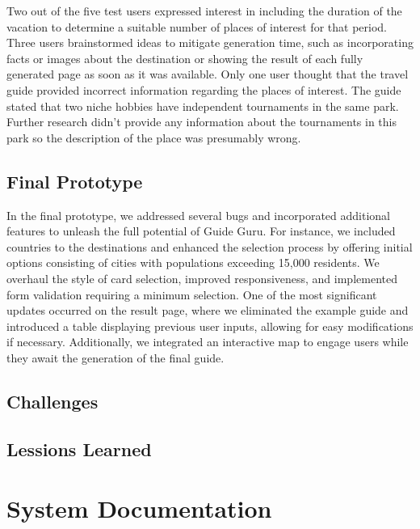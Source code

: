 \documentclass[english,notitlepage,smartquotes]{hgbreport}
\begin{document}
Two out of the five test users expressed interest in including the duration of the vacation to determine a suitable number of places of interest for that period. Three users brainstormed ideas to mitigate generation time, such as incorporating facts or images about the destination or showing the result of each fully generated page as soon as it was available. Only one user thought that the travel guide provided incorrect information regarding the places of interest. The guide stated that two niche hobbies have independent tournaments in the same park. Further research didn't provide any information about the tournaments in this park so the description of the place was presumably wrong.

\section{Final Prototype}

In the final prototype, we addressed several bugs and incorporated additional features to unleash the full potential of Guide Guru. For instance, we included countries to the destinations and enhanced the selection process by offering initial options consisting of cities with populations exceeding 15,000 residents. We overhaul the style of card selection, improved responsiveness, and implemented form validation requiring a minimum selection. One of the most significant updates occurred on the result page, where we eliminated the example guide and introduced a table displaying previous user inputs, allowing for easy modifications if necessary. Additionally, we integrated an interactive map to engage users while they await the generation of the final guide.
 
\section{Challenges}


\section{Lessions Learned}



\chapter{System Documentation}
\end{document}

